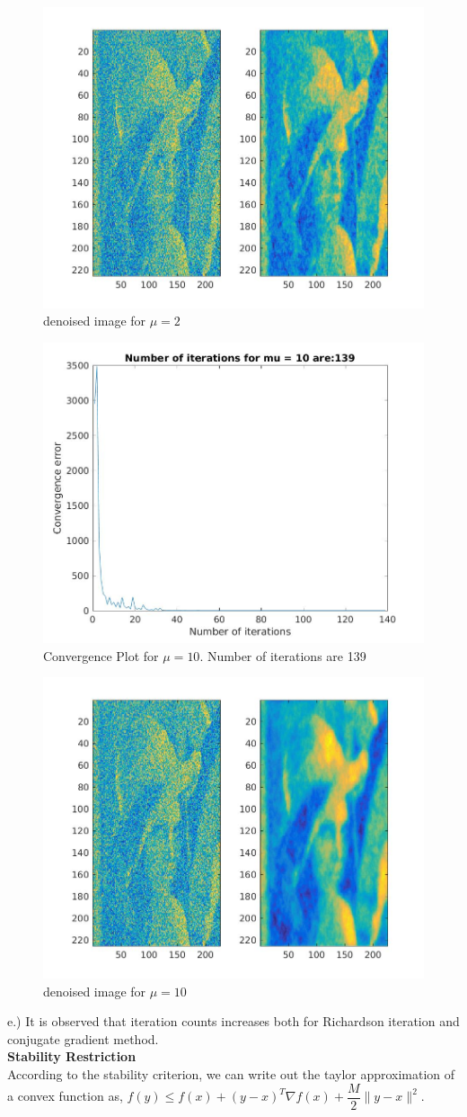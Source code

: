 \documentclass{article}
\begin{document}
\begin{figure}[H]
\centering
\includegraphics[width=0.5\linewidth]{conjgrad_denoised_2.jpg}
\caption{denoised image for $\mu = 2$}
\end{figure}


\begin{figure}[H]
\centering
\includegraphics[width=0.5\linewidth]{conjgrad_10.jpg}
\caption{Convergence Plot for $\mu = 10$. Number of iterations are 139}
\end{figure}

\begin{figure}[H]
\centering
\includegraphics[width=0.5\linewidth]{conjgrad_denoised_10.jpg}
\caption{denoised image for $\mu = 10$}
\end{figure}

e.) It is observed that iteration counts increases both for Richardson iteration and conjugate gradient method.\\

\textbf{Stability Restriction}\\
According to the stability criterion, we can write out the taylor approximation of a convex function as, $f(y)\leq f(x) + (y-x)^T \nabla f(x) +\dfrac{M}{2}\|y-x\|^2$. \\
\end{document}
